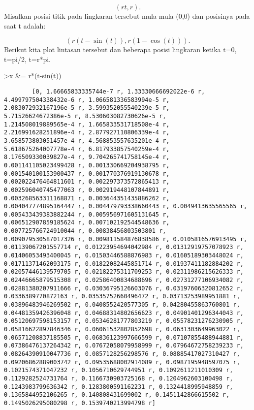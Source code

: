 \documentclass[
]{book}
\begin{document}
\[(rt,r).\]Misalkan posisi titik pada lingkaran tersebut mula-mula (0,0) dan posisinya pada saat t adalah:

\[(r(t-\sin(t)),r(1-\cos(t))).\]Berikut kita plot lintasan tersebut dan beberapa posisi lingkaran ketika t=0, t=pi/2, t=r*pi.

\textgreater x \&= r*(t-sin(t))

\begin{verbatim}
        [0, 1.66665833335744e-7 r, 1.33330666692022e-6 r, 
4.499797504338432e-6 r, 1.066581336583994e-5 r, 
2.083072932167196e-5 r, 3.599352055540239e-5 r, 
5.71526624672386e-5 r, 8.530603082730626e-5 r, 
1.214508019889565e-4 r, 1.665833531718508e-4 r, 
2.216991628251896e-4 r, 2.877927110806339e-4 r, 
3.658573803051457e-4 r, 4.568853557635201e-4 r, 
5.618675264007778e-4 r, 6.817933857540259e-4 r, 
8.176509330039827e-4 r, 9.704265741758145e-4 r, 
0.001141105023499428 r, 0.001330669204938795 r, 
0.001540100153900437 r, 0.001770376919130678 r, 
0.002022476464811601 r, 0.002297373572865413 r, 
0.002596040745477063 r, 0.002919448107844891 r, 
0.003268563311168871 r, 0.003644351435886262 r, 
0.004047774895164447 r, 0.004479793338660443 r, 0.0049413635565565 r, 
0.005433439383882244 r, 0.005956971605131645 r, 
0.006512907859185624 r, 0.007102192544548636 r, 
0.007725766724910044 r, 0.00838456803503801 r, 
0.009079530587017326 r, 0.009811584876838586 r, 0.0105816576913495 r, 
0.01139067201557714 r, 0.01223954694042984 r, 0.01312919757078923 r, 
0.01406053493400045 r, 0.01503446588876983 r, 0.01605189303448024 r, 
0.01711371462093175 r, 0.01822082445851714 r, 0.01937411182884202 r, 
0.02057446139579705 r, 0.02182275311709253 r, 0.02311986215626333 r, 
0.02446665879515308 r, 0.02586400834688696 r, 0.02731277106934082 r, 
0.02881380207911666 r, 0.03036795126603076 r, 0.03197606320812652 r, 
0.0336389770872163 r, 0.03535752660496472 r, 0.03713253989951881 r, 
0.03896483946269502 r, 0.0408552420577305 r, 0.04280455863760801 r, 
0.04481359426396048 r, 0.04688314802656623 r, 0.04901401296344043 r, 
0.05120697598153157 r, 0.05346281777803219 r, 0.05578231276230905 r, 
0.05816622897846346 r, 0.06061532802852698 r, 0.0631303649963022 r, 
0.06571208837185505 r, 0.06836123997666599 r, 0.07107855488944881 r, 
0.07386476137264342 r, 0.07672058079958999 r, 0.07964672758239233 r, 
0.08264390910047736 r, 0.0857128256298576 r, 0.08885417027310427 r, 
0.09206862889003742 r, 0.09535688002914089 r, 0.0987195948597075 r, 
0.1021574371047232 r, 0.1056710629744951 r, 0.1092611211010309 r, 
0.1129282524731764 r, 0.1166730903725168 r, 0.1204962603100498 r, 
0.1243983799636342 r, 0.1283800591162231 r, 0.1324418995948859 r, 
0.1365844952106265 r, 0.140808431699002 r, 0.1451142866615502 r, 
0.1495026295080298 r, 0.1539740213994798 r]
\end{verbatim}
\end{document}
